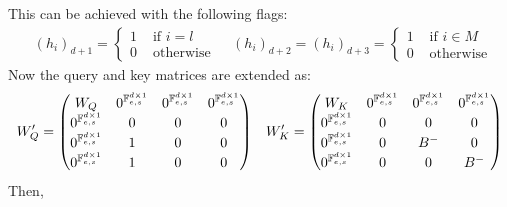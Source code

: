 This can be achieved with the following flags:
%
\begin{align*}
    & (h_i)_{d+1} = \begin{cases}
        1 & \text{ if } i = l \\
        0 & \text{ otherwise }
    \end{cases}
    & (h_i)_{d+2} = (h_i)_{d+3} = \begin{cases}
        1 & \text{ if } i \in M \\
        0 & \text{ otherwise }
    \end{cases}
\end{align*}
%
Now the query and key matrices are extended as:
%
\begin{align*}
    &
    W_Q' = \left(\begin{matrix}
        W_Q                         & 0^{\mathbb{F}_{e,s}^{d \times 1}} & 0^{\mathbb{F}_{e,s}^{d \times 1}} & 0^{\mathbb{F}_{e,s}^{d \times 1}} \\
        0^{\mathbb{F}_{e,s}^{d \times 1}} & 0 & 0 & 0 \\
        0^{\mathbb{F}_{e,s}^{d \times 1}} & 1 & 0 & 0 \\
        0^{\mathbb{F}_{e,s}^{d \times 1}} & 1 & 0 & 0 \\
    \end{matrix}\right)
    &
    W_K' = \left(\begin{matrix}
        W_K                         & 0^{\mathbb{F}_{e,s}^{d \times 1}} & 0^{\mathbb{F}_{e,s}^{d \times 1}}       & 0^{\mathbb{F}_{e,s}^{d \times 1}} \\
        0^{\mathbb{F}_{e,s}^{d \times 1}} & 0 & 0       & 0 \\
        0^{\mathbb{F}_{e,s}^{d \times 1}} & 0 & B^{-} & 0 \\
        0^{\mathbb{F}_{e,s}^{d \times 1}} & 0 & 0       & B^{-} \\
    \end{matrix}\right)
\end{align*}
%
Then, 
%
